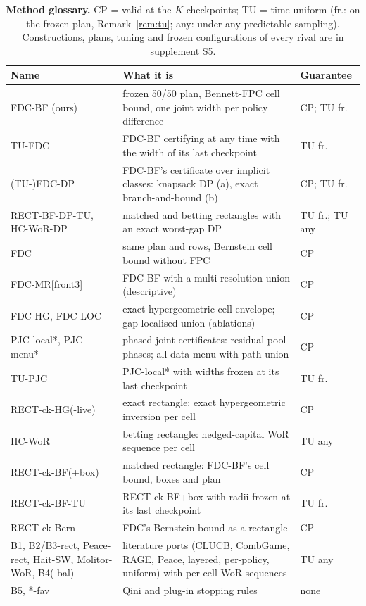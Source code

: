 \documentclass[sigconf,anonymous,review]{acmart}
\begin{document}
\begin{table}[H]
\caption{\textbf{Method glossary.} CP = valid at the $K$ checkpoints; TU = time-uniform (fr.: on the frozen plan, Remark~\ref{rem:tu}; any: under any predictable sampling). Constructions, plans, tuning and frozen configurations of every rival are in supplement S5.}
\label{tab:glossary}
\footnotesize
\setlength{\tabcolsep}{3pt}
\begin{tabular}{@{}>{\raggedright\arraybackslash}p{2.05cm}>{\raggedright\arraybackslash}p{4.05cm}>{\raggedright\arraybackslash}p{1.25cm}@{}}
\toprule
Name & What it is & Guarantee \\
\midrule
FDC-BF (ours) & frozen 50/50 plan, Bennett-FPC cell bound, one joint width per policy difference & CP; TU fr. \\
TU-FDC & FDC-BF certifying at any time with the width of its last checkpoint & TU fr. \\
(TU-)FDC-DP & FDC-BF's certificate over implicit classes: knapsack DP (a), exact branch-and-bound (b) & CP; TU fr. \\
RECT-BF-DP-TU, HC-WoR-DP & matched and betting rectangles with an exact worst-gap DP & TU fr.; TU any \\
FDC & same plan and rows, Bernstein cell bound without FPC & CP \\
FDC-MR[front3] & FDC-BF with a multi-resolution union (descriptive) & CP \\
FDC-HG, FDC-LOC & exact hypergeometric cell envelope; gap-localised union (ablations) & CP \\
PJC-local*, PJC-menu* & phased joint certificates: residual-pool phases; all-data menu with path union & CP \\
TU-PJC & PJC-local* with widths frozen at its last checkpoint & TU fr. \\
RECT-ck-HG(-live) & exact rectangle: exact hypergeometric inversion per cell & CP \\
HC-WoR & betting rectangle: hedged-capital WoR sequence per cell & TU any \\
RECT-ck-BF(+box) & matched rectangle: FDC-BF's cell bound, boxes and plan & CP \\
RECT-ck-BF-TU & RECT-ck-BF+box with radii frozen at its last checkpoint & TU fr. \\
RECT-ck-Bern & FDC's Bernstein bound as a rectangle & CP \\
B1, B2/B3-rect, Peace-rect, Hait-SW, Molitor-WoR, B4(-bal) & literature ports (CLUCB, CombGame, RAGE, Peace, layered, per-policy, uniform) with per-cell WoR sequences & TU any \\
B5, *-fav & Qini and plug-in stopping rules & none \\
\bottomrule
\end{tabular}
\end{table}
\end{document}
